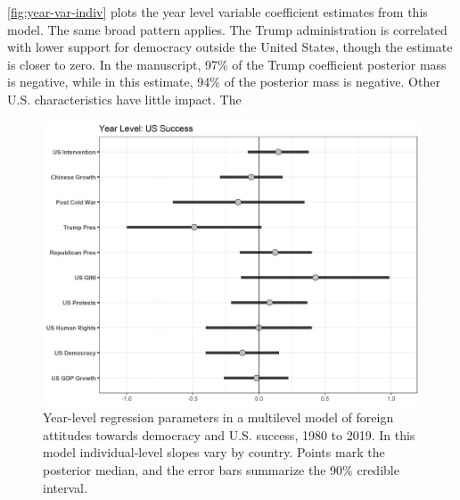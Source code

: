 \documentclass[12pt]{article}
\begin{document}
\autoref{fig:year-var-indiv} plots the year level variable coefficient estimates from this model. 
The same broad pattern applies.
The Trump administration is correlated with lower support for democracy outside the United States, though the estimate is closer to zero.
In the manuscript, 97\% of the Trump coefficient posterior mass is negative, while in this estimate, 94\% of the posterior mass is negative.
Other U.S. characteristics have little impact.
The  

\begin{figure}
\includegraphics[width = .95\textwidth]{year-var-indiv.png}
\caption{Year-level regression parameters in a multilevel model of foreign attitudes towards democracy and U.S. success, 1980 to 2019. In this model individual-level slopes vary by country. Points mark the posterior median, and the error bars summarize the 90\% credible interval.}
\label{fig:year-var-indiv} 
\end{figure}
  
  
  \newpage
 
\end{document}
